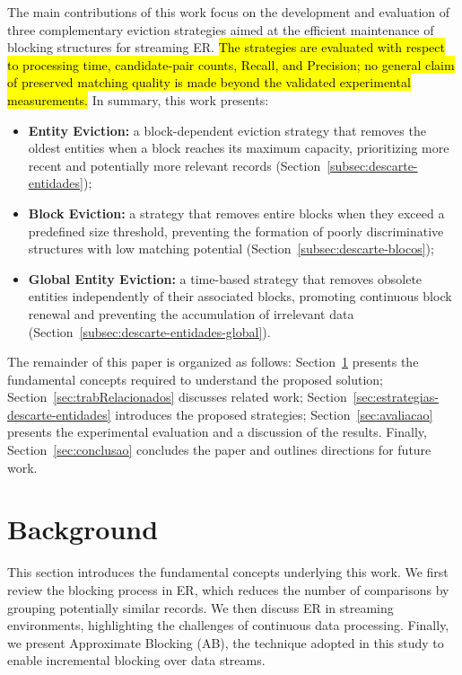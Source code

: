 \documentclass{ieeeaccess}
\begin{document}
The main contributions of this work focus on the development and evaluation of three complementary eviction strategies aimed at the efficient maintenance of blocking structures for streaming ER. \hl{The strategies are evaluated with respect to processing time, candidate-pair counts, Recall, and Precision; no general claim of preserved matching quality is made beyond the validated experimental measurements.} In summary, this work presents:
 
\begin{itemize}\small
    \item \textbf{Entity Eviction:} a block-dependent eviction strategy that removes the oldest entities when a block reaches its maximum capacity, prioritizing more recent and potentially more relevant records (Section~\ref{subsec:descarte-entidades});
    
    \item \textbf{Block Eviction:} a strategy that removes entire blocks when they exceed a predefined size threshold, preventing the formation of poorly discriminative structures with low matching potential (Section~\ref{subsec:descarte-blocos});
    
    \item \textbf{Global Entity Eviction:} a time-based strategy that removes obsolete entities independently of their associated blocks, promoting continuous block renewal and preventing the accumulation of irrelevant data (Section~\ref{subsec:descarte-entidades-global}).
    
\end{itemize}

The remainder of this paper is organized as follows: Section~\ref{sec:background} presents the fundamental concepts required to understand the proposed solution; Section~\ref{sec:trabRelacionados} discusses related work; Section~\ref{sec:estrategias-descarte-entidades} introduces the proposed strategies; Section~\ref{sec:avaliacao} presents the experimental evaluation and a discussion of the results. Finally, Section~\ref{sec:conclusao} concludes the paper and outlines directions for future work.

\section{Background} \label{sec:background}

This section introduces the fundamental concepts underlying this work. We first review the blocking process in ER, which reduces the number of comparisons by grouping potentially similar records. We then discuss ER in streaming environments, highlighting the challenges of continuous data processing. Finally, we present Approximate Blocking (AB), the technique adopted in this study to enable incremental blocking over data streams.
\end{document}
